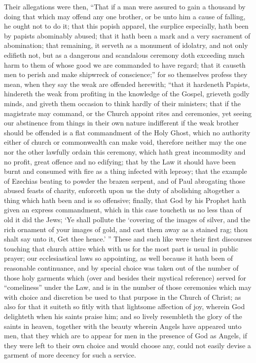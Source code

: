 Their allegations were then, “That if a man were assured to gain a thousand by doing that which may offend any one brother, or be unto him a cause of falling, he ought not to do it; that this popish apparel, the surplice especially, hath been by papists abominably abused; that it hath been a mark and a very sacrament of abomination; that remaining, it serveth as a monument of idolatry, and not only edifieth not, but as a dangerous and scandalous  ceremony doth exceeding much harm to them of whose good we are commanded to have regard; that it causeth men to perish and make shipwreck of conscience;” for so themselves profess they mean, when they say the weak are offended herewith; “that it hardeneth Papists, hindereth the weak from profiting in the knowledge of the Gospel, grieveth godly minds, and giveth them occasion to think hardly of their ministers; that if the magistrate may command, or the Church appoint rites and ceremonies, yet seeing our abstinence from things in their own nature indifferent if the weak brother should be offended is a flat commandment of the Holy Ghost, which no authority either of church or commonwealth can make void, therefore neither may the one nor the other lawfully ordain this ceremony, which hath great incommodity and no profit, great offence and no edifying; that by the Law it should have been burnt and consumed with fire as a thing infected with leprosy; that the example of Ezechias beating to powder the brazen serpent, and of Paul abrogating those abused feasts of charity, enforceth upon us the duty of abolishing altogether a thing which hath been and is so offensive; finally, that God by his Prophet hath given an express commandment, which in this case toucheth us no less than of old it did the Jews; ‘Ye shall pollute the ‘covering of the images of silver, and the rich ornament of your images of gold, and cast them away as a stained rag; thou shalt say unto it, Get thee hence.’ ”
These and such like were their first discourses touching that church attire which with us for the most part is usual in public prayer; our ecclesiastical laws so appointing, as well because it hath been of reasonable continuance, and by special choice was taken out of the number of those holy garments which (over and besides their mystical reference) served for “comeliness” under the Law, and is in the number of  those ceremonies which may with choice and discretion be used to that purpose in the Church of Christ; as also for that it suiteth so fitly with that lightsome affection of joy, wherein God delighteth when his saints praise him; and so lively resembleth the glory of the saints in heaven, together with the beauty wherein Angels have appeared unto men, that they which are to appear for men in the presence of God as Angels, if they were left to their own choice and would choose any, could not easily devise a garment of more decency for such a service.

